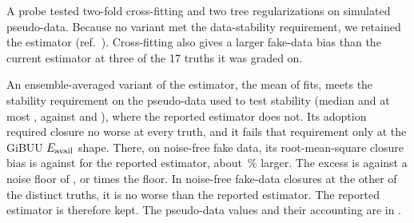A probe tested two-fold cross-fitting and two tree regularizations on simulated pseudo-data. Because no variant met the data-stability requirement, we retained the estimator (ref.~\cite{AnalysisNote2026}). Cross-fitting also gives a larger fake-data bias than the current estimator at three of the 17 truths it was graded on.

An ensemble-averaged variant of the estimator, the mean of  fits, meets the stability requirement on the pseudo-data used to test stability (median  and at most , against  and ), where the reported estimator does not. Its adoption required closure no worse at every truth, and it fails that requirement only at the GiBUU $E_{\mathrm{avail}}$ shape. There, on noise-free fake data, its root-mean-square closure bias is  against  for the reported estimator, about \,\% larger. The excess is  against a noise floor of , or  times the floor. In noise-free fake-data closures at the other  of the  distinct truths, it is no worse than the reported estimator. The reported estimator is therefore kept. The pseudo-data values and their accounting are in .

